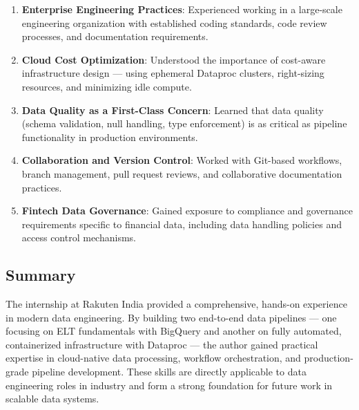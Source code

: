 \documentclass[12pt, a4paper]{article}
\begin{document}
\begin{enumerate}
    \item \textbf{Enterprise Engineering Practices}: Experienced working in a large-scale engineering organization with established coding standards, code review processes, and documentation requirements.
    
    \item \textbf{Cloud Cost Optimization}: Understood the importance of cost-aware infrastructure design --- using ephemeral Dataproc clusters, right-sizing resources, and minimizing idle compute.
    
    \item \textbf{Data Quality as a First-Class Concern}: Learned that data quality (schema validation, null handling, type enforcement) is as critical as pipeline functionality in production environments.
    
    \item \textbf{Collaboration and Version Control}: Worked with Git-based workflows, branch management, pull request reviews, and collaborative documentation practices.
    
    \item \textbf{Fintech Data Governance}: Gained exposure to compliance and governance requirements specific to financial data, including data handling policies and access control mechanisms.
\end{enumerate}

\subsection{Summary}

\noindent The internship at Rakuten India provided a comprehensive, hands-on experience in modern data engineering. By building two end-to-end data pipelines --- one focusing on ELT fundamentals with BigQuery and another on fully automated, containerized infrastructure with Dataproc --- the author gained practical expertise in cloud-native data processing, workflow orchestration, and production-grade pipeline development. These skills are directly applicable to data engineering roles in industry and form a strong foundation for future work in scalable data systems.
\end{document}
